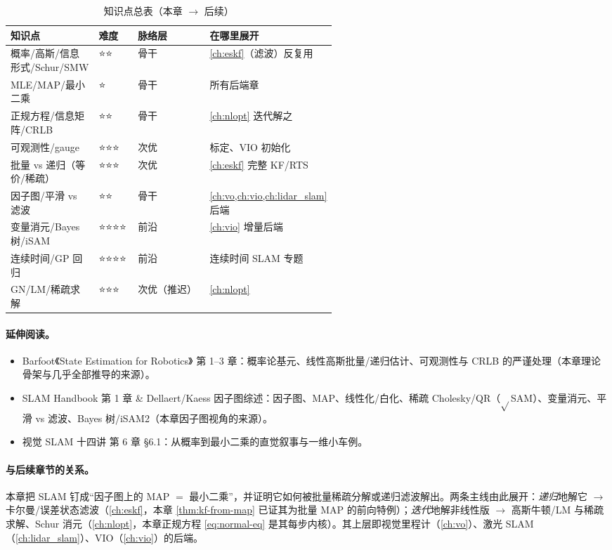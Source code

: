 \begin{table}[ht]\centering\small
\caption{知识点总表（本章 $\to$ 后续）}
\begin{tabular}{p{0.27\linewidth}llp{0.27\linewidth}}
\toprule
知识点 & 难度 & 脉络层 & 在哪里展开 \\
\midrule
概率/高斯/信息形式/Schur/SMW & ⭐⭐ & 骨干 & \cref{ch:eskf}（滤波）反复用 \\
MLE/MAP/最小二乘 & ⭐ & 骨干 & 所有后端章 \\
正规方程/信息矩阵/CRLB & ⭐⭐ & 骨干 & \cref{ch:nlopt} 迭代解之 \\
可观测性/gauge & ⭐⭐⭐ & 次优 & 标定、VIO 初始化 \\
批量 vs 递归（等价/稀疏） & ⭐⭐⭐ & 次优 & \cref{ch:eskf} 完整 KF/RTS \\
因子图/平滑 vs 滤波 & ⭐⭐ & 骨干 & \cref{ch:vo,ch:vio,ch:lidar_slam} 后端 \\
变量消元/Bayes 树/iSAM & ⭐⭐⭐⭐ & 前沿 & \cref{ch:vio} 增量后端 \\
连续时间/GP 回归 & ⭐⭐⭐⭐ & 前沿 & 连续时间 SLAM 专题 \\
GN/LM/稀疏求解 & ⭐⭐⭐ & 次优（推迟） & \cref{ch:nlopt} \\
\bottomrule
\end{tabular}
\end{table}

\paragraph{延伸阅读。}
\begin{itemize}
  \item Barfoot《State Estimation for Robotics》\cite{barfoot2024state} 第 1--3 章：概率论基元、线性高斯批量/递归估计、可观测性与 CRLB 的严谨处理（本章理论骨架与几乎全部推导的来源）。
  \item SLAM Handbook\cite{carlone2026handbook} 第 1 章 \& Dellaert/Kaess 因子图综述\cite{dellaert2017factor}：因子图、MAP、线性化/白化、稀疏 Cholesky/QR（$\sqrt{}$SAM）、变量消元、平滑 vs 滤波、Bayes 树/iSAM2（本章因子图视角的来源）。
  \item 视觉 SLAM 十四讲\cite{gaoxiang2019slam14} 第 6 章 §6.1：从概率到最小二乘的直觉叙事与一维小车例。
\end{itemize}

\paragraph{与后续章节的关系。}
本章把 SLAM 钉成“因子图上的 MAP $=$ 最小二乘”，并证明它如何被批量稀疏分解或递归滤波解出。两条主线由此展开：\emph{递归}地解它 $\to$ 卡尔曼/误差状态滤波（\cref{ch:eskf}，本章 \cref{thm:kf-from-map} 已证其为批量 MAP 的前向特例）；\emph{迭代}地解非线性版 $\to$ 高斯牛顿/LM 与稀疏求解、Schur 消元（\cref{ch:nlopt}，本章正规方程 \cref{eq:normal-eq} 是其每步内核）。其上层即视觉里程计（\cref{ch:vo}）、激光 SLAM（\cref{ch:lidar_slam}）、VIO（\cref{ch:vio}）的后端。

